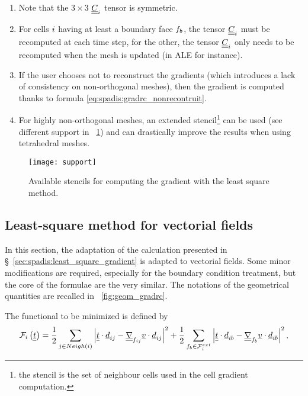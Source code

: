 \begin{remark}
\begin{enumerate}[ label=\roman{*}/, ref=(\roman{*})]
\item Note that the $3\times3$ $\underline{\underline{C}}_i$ tensor is symmetric.
\item For cells $i$ having at least a boundary face ${f_{b}}$, the tensor $\underline{\underline{C}}_i$ must be recomputed at each time step,
for the other, the tensor $\underline{\underline{C}}_i$ only needs to be recomputed when the mesh is updated (in ALE for instance).
\item If the user chooses not to reconstruct the gradients (which introduces a lack of consistency on non-orthogonal meshes),
then the gradient is computed thanks to formula \eqref{eq:spadis:gradrc_nonrecontruit}.
\item For highly non-orthogonal meshes, an extended stencil\footnote{
the stencil is the set of neighbour cells used in the cell gradient computation.
} can be used (see different support in \figurename~\ref{fig:spadis:gradmc_support}) and can drastically improve the results when using tetrahedral meshes.
\end{enumerate}
\end{remark}

\begin{figure}[!htp]
\centerline{\texttt{[image: support]}}
\caption{Available stencils for computing the gradient with the least square method.\label{fig:spadis:gradmc_support}}
\end{figure}


\subsection{Least-square method for vectorial fields}\label{sec:spadis:least_square_gradient_vectors}
%
In this section, the adaptation of the calculation presented in \S~\ref{sec:spadis:least_square_gradient} is adapted to
vectorial fields. Some minor modifications are required, especially for the boundary condition treatment, but the core of the
formulae are the very similar. The notations of the geometrical quantities are recalled in \figurename~\ref{fig:geom_gradrc}.

The functional to be minimized is defined by
%
\begin{equation}\label{eq:spadis:gradmv_function}
\mathcal{F}_i
\left( \underline{\underline{t}} \right) =
\dfrac{1}{2}\sum\limits_{j \in Neigh\left(i\right)  }
\left| 
 \underline{\underline{t}}   \cdot \underline{d}_{ij}  -  \underline{\underline{\nabla}}_{{f_{ij}}} \underline{v}   \cdot \underline{d}_{ij}
 \right|^2+
\dfrac{1}{2}\sum\limits_{ {f_{b}} \in \mathcal{F}^{ext}_{i}}
\left| 
 \underline{\underline{t}}   \cdot \underline{d}_{ib}  -  \underline{\underline{\nabla}}_{{f_{b}}} \underline{v}   \cdot \underline{d}_{ib}
 \right|^2,
\end{equation}

